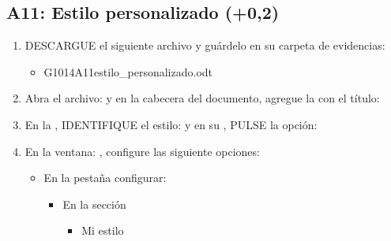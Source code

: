 \documentclass[letterpaper,10pt,spanish]{sphinxmanual}
\begin{document}
\subsection{A11: Estilo personalizado  (+0,2)}
\label{\detokenize{1_guias/10ofimatica/G1014:a11-estilo-personalizado-101-0-2}}\begin{enumerate}
%
\item {} 
\sphinxAtStartPar
DESCARGUE el siguiente archivo y guárdelo en su carpeta de evidencias:
\begin{itemize}
\item {} 
\sphinxAtStartPar
G1014A11\sphinxhyphen{}estilo\_personalizado.odt 

\end{itemize}

\item {} 
\sphinxAtStartPar
Abra el archivo:  y en la cabecera del documento, agregue la  con el título: 

\item {} 
\sphinxAtStartPar
En la , IDENTIFIQUE el estilo:  y en su , PULSE la opción: 

\item {} 
\sphinxAtStartPar
En la ventana: , configure las siguiente opciones:
\begin{itemize}
\item {} 
\sphinxAtStartPar
En la pestaña  configurar:
\begin{itemize}
\item {} 
\sphinxAtStartPar
En la sección 
\begin{itemize}
\item {} 
\sphinxAtStartPar
{} Mi estilo

\end{itemize}

\end{itemize}


\end{itemize}
\end{enumerate}
\end{document}
